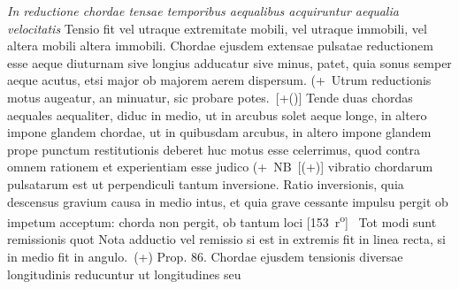 \textit{In reductione chordae tensae temporibus aequalibus acquiruntur aequalia velocitatis } 
Tensio fit vel utraque extremitate mobili, vel utraque immobili, vel altera mobili altera immobili. 
Chordae ejusdem extensae pulsatae reductionem esse aeque diuturnam sive longius adducatur sive minus, patet, quia sonus semper aeque acutus, etsi major ob majorem aerem dispersum. (+~Utrum reductionis motus augeatur, an minuatur, sic probare potes.~[+\phantom(\hspace{-1.2mm})]
Tende duas chordas aequales aequaliter, diduc in medio, ut in arcubus solet aeque longe, in altero impone glandem chordae, ut in quibusdam arcubus, in altero impone glandem prope punctum restitutionis deberet huc motus esse celerrimus, quod contra omnem rationem et experientiam esse judico (+~NB~[\phantom(\hspace{-1.2mm}+)] vibratio chordarum pulsatarum est ut perpendiculi  tantum inversione. Ratio inversionis, quia descensus\protect{} gravium causa in medio  intus, et quia grave cessante impulsu pergit ob impetum acceptum: chorda non pergit, ob tantum loci 
[153~r\textsuperscript{o}]
\pend%
\pstart%
%
%
%
 \, Tot modi sunt remissionis quot 
Nota adductio vel remissio si est in extremis fit in linea recta, si in medio fit in angulo.~\phantom(\hspace{-1.2mm}+)
Prop. 86. Chordae ejusdem tensionis diversae longitudinis reducuntur ut longitudines seu
